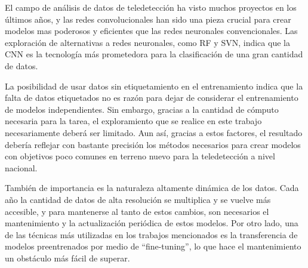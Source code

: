 El campo de análisis de datos de teledetección ha visto muchos proyectos en los últimos años, y las redes convolucionales han sido una pieza crucial para crear modelos mas poderosos y eficientes que las redes neuronales convencionales. Las exploración de alternativas a redes neuronales, como RF y SVN, indica que la CNN es la tecnología más prometedora para la clasificación de una gran cantidad de datos.

La posibilidad de usar datos sin etiquetamiento en el entrenamiento indica que la falta de datos etiquetados no es razón para dejar de considerar el entrenamiento de modelos independientes. Sin embargo, gracias a la cantidad de cómputo necesaria para la tarea, el exploramiento que se realice en este trabajo necesariamente deberá ser limitado. Aun así, gracias a estos factores, el resultado debería reflejar con bastante precisión los métodos necesarios para crear modelos con objetivos poco comunes en terreno nuevo para la teledetección a nivel nacional.

También de importancia es la naturaleza altamente dinámica de los datos. Cada año la cantidad de datos de alta resolución se multiplica y se vuelve más accesible, y para mantenerse al tanto de estos cambios, son necesarios el mantenimiento y la actualización periódica de estos modelos. Por otro lado, una de las técnicas más utilizadas en los trabajos mencionados es la transferencia de modelos preentrenados por medio de \enquote{fine-tuning}, lo que hace el mantenimiento un obstáculo más fácil de superar.

